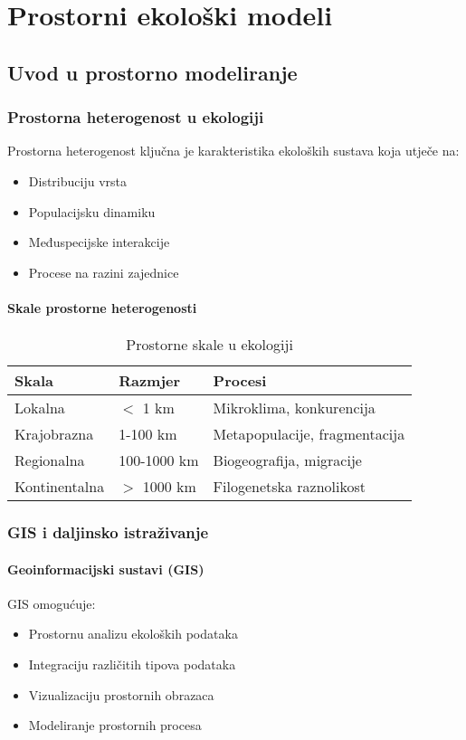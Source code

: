 \documentclass[12pt,a4paper,twoside]{book}
\begin{document}
	\part{Prostorni ekološki modeli}
	
	\chapter{Uvod u prostorno modeliranje}
	
	\section{Prostorna heterogenost u ekologiji}
	
	Prostorna heterogenost ključna je karakteristika ekoloških sustava koja utječe na:
	\begin{itemize}
		\item Distribuciju vrsta
		\item Populacijsku dinamiku
		\item Međuspecijske interakcije
		\item Procese na razini zajednice
	\end{itemize}
	
	\subsection{Skale prostorne heterogenosti}
	\begin{table}[H]
		\centering
		\caption{Prostorne skale u ekologiji}
		\begin{tabular}{@{}lll@{}}
			\toprule
			Skala & Razmjer & Procesi \\
			\midrule
			Lokalna & $<$ 1 km & Mikroklima, konkurencija \\
			Krajobrazna & 1-100 km & Metapopulacije, fragmentacija \\
			Regionalna & 100-1000 km & Biogeografija, migracije \\
			Kontinentalna & $>$ 1000 km & Filogenetska raznolikost \\
			\bottomrule
		\end{tabular}
	\end{table}
	
	\section{GIS i daljinsko istraživanje}
	
	\subsection{Geoinformacijski sustavi (GIS)}
	GIS omogućuje:
	\begin{itemize}
		\item Prostornu analizu ekoloških podataka
		\item Integraciju različitih tipova podataka
		\item Vizualizaciju prostornih obrazaca
		\item Modeliranje prostornih procesa
	\end{itemize}
	
\end{document}
